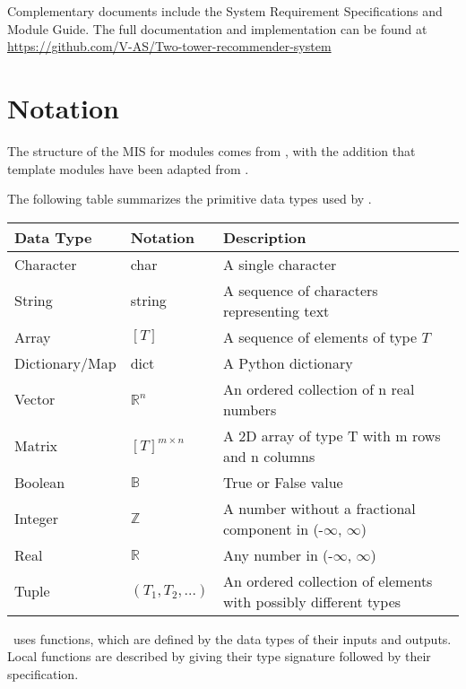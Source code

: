 \documentclass[12pt, titlepage]{article}
\begin{document}
Complementary documents include the System Requirement Specifications
and Module Guide.  The full documentation and implementation can be
found at \url{https://github.com/V-AS/Two-tower-recommender-system}

\section{Notation}

The structure of the MIS for modules comes from \citet{HoffmanAndStrooper1995},
with the addition that template modules have been adapted from
\cite{GhezziEtAl2003}.

The following table summarizes the primitive data types used by \progname. 

\begin{center}
\renewcommand{\arraystretch}{1.2}
\noindent 
\begin{tabular}{l l p{7.5cm}} 
\toprule 
\textbf{Data Type} & \textbf{Notation} & \textbf{Description}\\ 
\midrule
Character & char & A single character\\
String & string & A sequence of characters representing text\\
Array & $[T]$ & A sequence of elements of type $T$\\
Dictionary/Map & dict & A Python dictionary\\
Vector & $\mathbb{R}^n$ & An ordered collection of n real numbers\\
Matrix &$[T]^{m\times n}$ & A 2D array of type T with m rows and n columns\\
Boolean & $\mathbb{B}$ & True or False value\\
Integer & $\mathbb{Z}$ & A number without a fractional component in (-$\infty$, $\infty$) \\
Real & $\mathbb{R}$ & Any number in (-$\infty$, $\infty$)\\
Tuple & $(T_1, T_2, ...)$ & An ordered collection of elements with possibly different types\\
\bottomrule
\end{tabular} 
\end{center}

\noindent
\progname \ uses functions, which
are defined by the data types of their inputs and outputs. Local functions are
described by giving their type signature followed by their specification.
\end{document}
